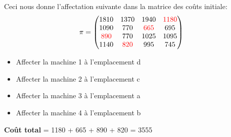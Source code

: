 \documentclass{article}
\begin{document}
Ceci nous donne l'affectation suivante dans la matrice des coûts initiale:
$$\pi=\begin{pmatrix}
1810 & 1370 & 1940 & \textcolor{red}{1180} \\
1090 & 770 & \textcolor{red}{665} & 695\\
\textcolor{red}{890} & 770 & 1025 & 1095\\
1140 & \textcolor{red}{820} & 995 & 745
\end{pmatrix}$$

\begin{itemize}
    \item Affecter la machine 1 à l'emplacement d 
    \item Affecter la machine 2 à l'emplacement c
    \item Affecter la machine 3 à l'emplacement a 
    \item Affecter la machine 4 à l'emplacement b 
\end{itemize}

\textbf{Coût total} = 1180 + 665 + 890 + 820 = 3555
\clearpage
\end{document}
